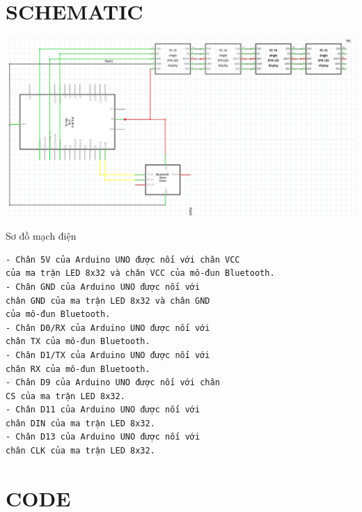 \documentclass[conference]{IEEEtran}
\begin{document}
\section{\textbf{SCHEMATIC}}

    \includegraphics[width=1.20\linewidth]{Bluetooth Controlled LED Matrix.png}
    \caption{Sơ đồ mạch điện}
    \label{fig:enter-label}

    \begin{verbatim}
- Chân 5V của Arduino UNO được nối với chân VCC 
của ma trận LED 8x32 và chân VCC của mô-đun Bluetooth.
- Chân GND của Arduino UNO được nối với 
chân GND của ma trận LED 8x32 và chân GND 
của mô-đun Bluetooth.
- Chân D0/RX của Arduino UNO được nối với 
chân TX của mô-đun Bluetooth.
- Chân D1/TX của Arduino UNO được nối với 
chân RX của mô-đun Bluetooth.
- Chân D9 của Arduino UNO được nối với chân 
CS của ma trận LED 8x32.
- Chân D11 của Arduino UNO được nối với 
chân DIN của ma trận LED 8x32.
- Chân D13 của Arduino UNO được nối với 
chân CLK của ma trận LED 8x32.
    \end{verbatim}
\section{\textbf{CODE}}
\end{document}

